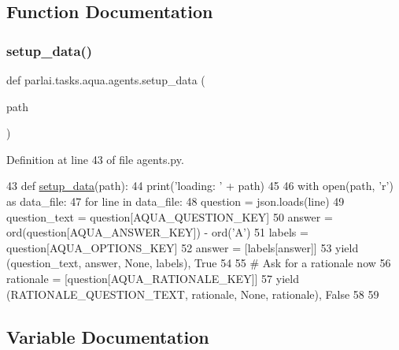 \subsection{Function Documentation}
\mbox{\label{namespaceparlai_1_1tasks_1_1aqua_1_1agents_a2d4e9f4e80d4edc0646c7e3d52be9f25}} 
\subsubsection{\texorpdfstring{setup\+\_\+data()}{setup\_data()}}
{\footnotesize\ttfamily def parlai.\+tasks.\+aqua.\+agents.\+setup\+\_\+data (\begin{DoxyParamCaption}\item[{}]{path }\end{DoxyParamCaption})}



Definition at line 43 of file agents.\+py.


\begin{DoxyCode}
43 \textcolor{keyword}{def }\hyperlink{namespaceparlai_1_1tasks_1_1multinli_1_1agents_a4fa2cb0ba1ed745336ad8bceed36b841}{setup\_data}(path):
44     print(\textcolor{stringliteral}{'loading: '} + path)
45 
46     with open(path, \textcolor{stringliteral}{'r') as data\_file:}
47 \textcolor{stringliteral}{        }\textcolor{keywordflow}{for} line \textcolor{keywordflow}{in} data\_file:
48             question = json.loads(line)
49             question\_text = question[AQUA\_QUESTION\_KEY]
50             answer = ord(question[AQUA\_ANSWER\_KEY]) - ord(\textcolor{stringliteral}{'A'})
51             labels = question[AQUA\_OPTIONS\_KEY]
52             answer = [labels[answer]]
53             \textcolor{keywordflow}{yield} (question\_text, answer, \textcolor{keywordtype}{None}, labels), \textcolor{keyword}{True}
54 
55             \textcolor{comment}{# Ask for a rationale now}
56             rationale = [question[AQUA\_RATIONALE\_KEY]]
57             \textcolor{keywordflow}{yield} (RATIONALE\_QUESTION\_TEXT, rationale, \textcolor{keywordtype}{None}, rationale), \textcolor{keyword}{False}
58 
59 
\end{DoxyCode}


\subsection{Variable Documentation}
\mbox{\label{namespaceparlai_1_1tasks_1_1aqua_1_1agents_ac1c607195fc8111cc32f83b710ae8ef8}} 
